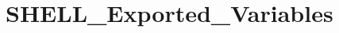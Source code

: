 \hypertarget{group___s_h_e_l_l___exported___variables}{}\section{S\+H\+E\+L\+L\+\_\+\+Exported\+\_\+\+Variables}
\label{group___s_h_e_l_l___exported___variables}
